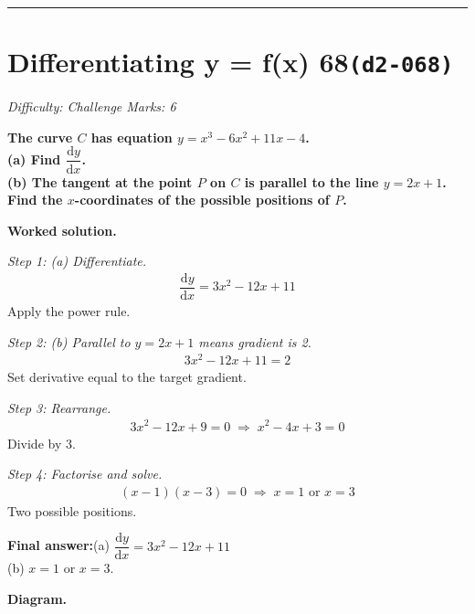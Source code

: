 \documentclass[11pt]{article}
\newcommand{\question}[1]{\par\medskip\noindent\textbf{#1}\par}
\begin{document}
\medskip\hrule

\section*{Differentiating y = f(x) 68\quad\small\texttt{(d2-068)}}
\textit{Difficulty: Challenge \quad\textbar\quad Marks: 6}

\question{The curve \( C \) has equation \( y = x^3 - 6x^2 + 11x - 4 \).\\[3pt]  (a) Find \( \dfrac{\mathrm{d}y}{\mathrm{d}x} \).\\[3pt]  (b) The tangent at the point \( P \) on \( C \) is parallel to the line \( y = 2x + 1 \). Find the \( x \)-coordinates of the possible positions of \( P \).}

\textbf{Worked solution.}

\textit{Step 1: (a) Differentiate.}
\[\begin{gathered}
\dfrac{\mathrm{d}y}{\mathrm{d}x} = 3x^2 - 12x + 11
\end{gathered}\]
Apply the power rule.

\textit{Step 2: (b) Parallel to \( y = 2x + 1 \) means gradient is 2.}
\[\begin{gathered}
3x^2 - 12x + 11 = 2
\end{gathered}\]
Set derivative equal to the target gradient.

\textit{Step 3: Rearrange.}
\[\begin{gathered}
3x^2 - 12x + 9 = 0 \;\Rightarrow\; x^2 - 4x + 3 = 0
\end{gathered}\]
Divide by 3.

\textit{Step 4: Factorise and solve.}
\[\begin{gathered}
(x - 1)(x - 3) = 0 \;\Rightarrow\; x = 1 \text{ or } x = 3
\end{gathered}\]
Two possible positions.

\begin{answerbox}
\textbf{Final answer:}\quad (a) \(\displaystyle  \dfrac{\mathrm{d}y}{\mathrm{d}x} = 3x^2 - 12x + 11 \) \\[3pt]  (b) \(\displaystyle  x = 1 \) or \(\displaystyle  x = 3 \).
\end{answerbox}
\textbf{Diagram.}
\end{document}
